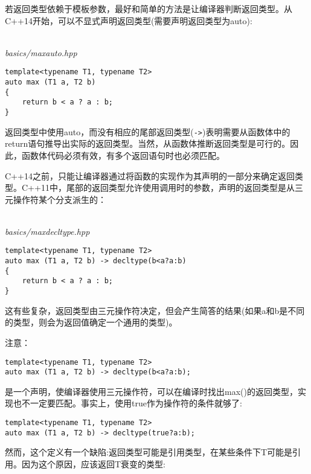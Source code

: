 
若返回类型依赖于模板参数，最好和简单的方法是让编译器判断返回类型。从C++14开始，可以不显式声明返回类型(需要声明返回类型为auto):

\hspace*{\fill} \\ %
\noindent
\textit{basics/maxauto.hpp}
\begin{lstlisting}[style=styleCXX]
template<typename T1, typename T2>
auto max (T1 a, T2 b)
{
	return b < a ? a : b;
}
\end{lstlisting}

返回类型中使用auto，而没有相应的尾部返回类型(\texttt{->})表明需要从函数体中的return语句推导出实际的返回类型。当然，从函数体推断返回类型是可行的。因此，函数体代码必须有效，有多个返回语句时也必须匹配。

C++14之前，只能让编译器通过将函数的实现作为其声明的一部分来确定返回类型。C++11中，尾部的返回类型允许使用调用时的参数，声明的返回类型是从三元操作符某个分支派生的：

\hspace*{\fill} \\ %
\noindent
\textit{basics/maxdecltype.hpp}
\begin{lstlisting}[style=styleCXX]
template<typename T1, typename T2>
auto max (T1 a, T2 b) -> decltype(b<a?a:b)
{
	return b < a ? a : b;
}
\end{lstlisting}

这有些复杂，返回类型由三元操作符决定，但会产生简答的结果(如果a和b是不同的类型，则会为返回值确定一个通用的类型)。

注意：

\begin{lstlisting}[style=styleCXX]
template<typename T1, typename T2>
auto max (T1 a, T2 b) -> decltype(b<a?a:b);
\end{lstlisting}

是一个声明，使编译器使用三元操作符，可以在编译时找出max()的返回类型，实现也不一定要匹配。事实上，使用true作为操作符的条件就够了:

\begin{lstlisting}[style=styleCXX]
template<typename T1, typename T2>
auto max (T1 a, T2 b) -> decltype(true?a:b);
\end{lstlisting}

然而，这个定义有一个缺陷:返回类型可能是引用类型，在某些条件下T可能是引用。因为这个原因，应该返回T衰变的类型:

